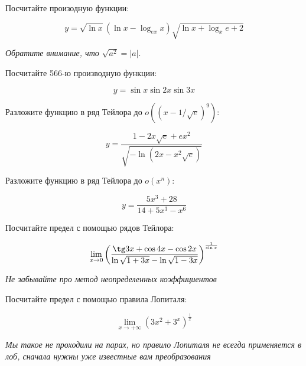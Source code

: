 \documentclass[russian]{article}
\begin{document}
Посчитайте произодную функции:

$$y = \sqrt{\ln x}(\ln x - \log_{ex}x)\sqrt{\ln x + \log_x e + 2}$$

\textit{Обратите внимание, что $\sqrt{a^2} = |a|.$}

Посчитайте 566-ю производную функции:

$$y = \sin x \sin 2x \sin 3x$$

Разложите функцию в ряд Тейлора до $o((x - 1/\sqrt{e})^9)$:

$$y = \frac{1 -2x \sqrt{e} + ex^2}{\sqrt{-\ln(2x-x^2\sqrt{e})}}$$

Разложите функцию в ряд Тейлора до $o(x^n)$:

$$y = \frac{5x^3 + 28}{14 + 5x^3 - x^6}$$

Посчитайте предел с помощью рядов Тейлора:

$$\lim\limits_{x \to 0} \left( \frac{\tg 3x + \cos 4x - \cos 2x}{\ln\sqrt{1 + 3x} - \ln\sqrt{1 - 3x}} \right)^\frac{1}{\sin x}$$

\textit{Не забывайте про метод неопределенных коэффициентов}

Посчитайте предел с помощью правила Лопиталя:

$$\lim\limits_{x \to +\infty}(3x^2 + 3^x)^\frac{1}{x}$$

\textit{Мы такое не проходили на парах, но правило Лопиталя не всегда применяется в лоб, сначала нужны уже известные вам преобразования}
\end{document}
